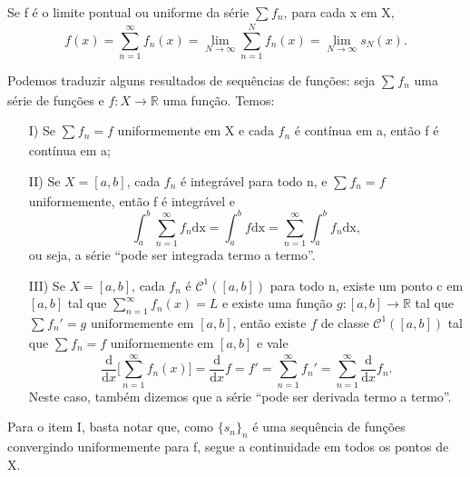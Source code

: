 \documentclass[../analysisII_notes.tex]{subfiles}
\begin{document}
\begin{tcolorbox}[
		skin=enhanced,
		title=Observação,
		fonttitle=\bfseries,
		colframe=black,
		colbacktitle=cyan!75!white,
		colback=cyan!15,
		colbacklower=black,
		coltitle=black,
		drop fuzzy shadow,
	]
	Se f é o limite pontual ou uniforme da série \(\sum\limits_{}^{}f_{n} \), para cada x em X,
	\[
		f(x) = \sum\limits_{n=1}^{\infty}f_{n}(x) = \lim_{N\to \infty}\sum\limits_{n=1}^{N}f_{n}(x) = \lim_{N\to \infty}s_{N}(x).
	\]
\end{tcolorbox}

Podemos traduzir alguns resultados de sequências de funções: seja \(\sum\limits_{}^{}f_{n}\) uma série de funções e \(f:X\rightarrow \mathbb{R}\) uma função. Temos:
\begin{itemize}
	\item[I)] Se \(\sum\limits_{}^{}f_{n} = f\) uniformemente em X e cada \(f_{n}\) é contínua em a, então f é contínua em a;
	\item[II)] Se \(X = [a, b]\), cada \(f_{n}\) é integrável para todo n, e \(\sum\limits_{}^{}f_{n} = f\) uniformemente, então f é integrável e
	      \[
		      \int_{a}^{b}\sum\limits_{n=1}^{\infty}f_{n} \mathrm{dx} = \int_{a}^{b}f \mathrm{dx} = \sum\limits_{n=1}^{\infty}\int_{a}^{b}f_{n} \mathrm{dx},
	      \]
	      ou seja, a série ``pode ser integrada termo a termo''.
	\item[III)] Se \(X = [a, b]\), cada \(f_{n}\) é \(\mathcal{C}^{1}([a, b])\) para todo n, existe um ponto c em \([a, b]\) tal que \(\sum\limits_{n=1}^{\infty}f_{n}(x) = L\) e existe uma função \(g:[a, b]\rightarrow \mathbb{R}\) tal que \(\sum\limits_{}^{}f_{n}' = g\) uniformemente em \([a, b]\), então existe \(f\) de classe \(\mathcal{C}^{1}([a, b])\) tal que \(\sum\limits_{}^{}f_{n} = f\) uniformemente em \([a, b]\) e vale
	      \[
		      \frac{\mathrm{d}}{\mathrm{d}x}\biggl[\sum\limits_{n=1}^{\infty}f_{n}(x)\biggr] = \frac{\mathrm{d}}{\mathrm{d}x}f = f' = \sum\limits_{n=1}^{\infty}f_{n}' = \sum\limits_{n=1}^{\infty}\frac{\mathrm{d}}{\mathrm{d}x}f_{n}.
	      \]
	      Neste caso, também dizemos que a série ``pode ser derivada termo a termo''.
\end{itemize}
Para o item I, basta notar que, como \(\{s_{n}\}_{n}\) é uma sequência de funções convergindo uniformemente para f, segue a continuidade em todos os pontos de X.
\end{document}
